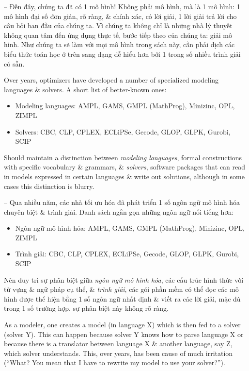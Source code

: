 \documentclass{article}
\begin{document}
\begin{itemize}
\begin{itemize}
        -- Đến đây, chúng ta đã có 1 mô hình! Không phải mô hình, mà là 1 mô hình: 1 mô hình đại số đơn giản, rõ ràng, \& chính xác, có lời giải, 1 lời giải trả lời cho câu hỏi ban đầu của chúng ta. Vì chúng ta không chỉ là những nhà lý thuyết không quan tâm đến ứng dụng thực tế, bước tiếp theo của chúng ta: giải mô hình. Như chúng ta sẽ làm với mọi mô hình trong sách này, cần phải dịch các biểu thức toán học ở trên sang dạng dễ hiểu hơn bởi 1 trong số nhiều trình giải có sẵn.

        Over years, optimizers have developed a number of specialized modeling languages \& solvers. A short list of better-known ones:
        \begin{itemize}
            \item Modeling languages: AMPL, GAMS, GMPL (MathProg), Minizinc, OPL, ZIMPL
            \item Solvers: CBC, CLP, CPLEX, ECLiPSe, Gecode, GLOP, GLPK, Gurobi, SCIP
        \end{itemize}
        Should maintain a distinction between {\it modeling languages}, formal constructions with specific vocabulary \& grammars, \& {\it solvers}, software packages that can read in models expressed in certain languages \& write out solutions, although in some cases this distinction is blurry.

        -- Qua nhiều năm, các nhà tối ưu hóa đã phát triển 1 số ngôn ngữ mô hình hóa chuyên biệt \& trình giải. Danh sách ngắn gọn những ngôn ngữ nổi tiếng hơn:
        \begin{itemize}
            \item Ngôn ngữ mô hình hóa: AMPL, GAMS, GMPL (MathProg), Minizinc, OPL, ZIMPL
            \item Trình giải: CBC, CLP, CPLEX, ECLiPSe, Gecode, GLOP, GLPK, Gurobi, SCIP
        \end{itemize}
        Nên duy trì sự phân biệt giữa {\it ngôn ngữ mô hình hóa}, các cấu trúc hình thức với từ vựng \& ngữ pháp cụ thể, \& {\it trình giải}, các gói phần mềm có thể đọc các mô hình được thể hiện bằng 1 số ngôn ngữ nhất định \& viết ra các lời giải, mặc dù trong 1 số trường hợp, sự phân biệt này không rõ ràng.

        As a modeler, one creates a model (in language X) which is then fed to a solver (solver Y). This can happen because solver Y knows how to parse language X or because there is a translator between language X \& another language, say Z, which solver understands. This, over years, has been cause of much irritation (``What? You mean that I have to rewrite my model to use your solver?'').


\end{itemize}
\end{itemize}
\end{document}
